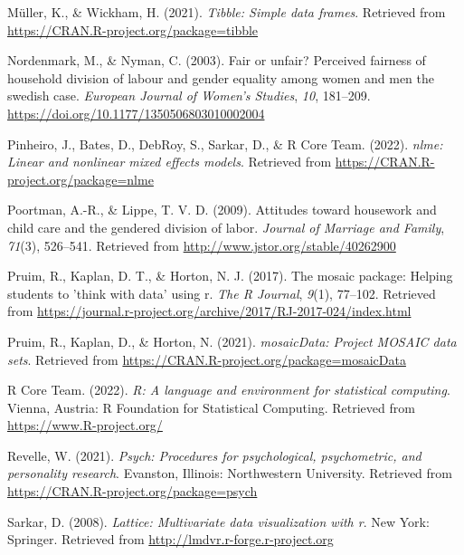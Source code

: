 \documentclass[
  man]{apa6}
\newlength{\cslhangindent}
\newlength{\cslentryspacingunit} %
\newenvironment{CSLReferences}[2] %
 {%
  \setlength{\parindent}{0pt}
  \ifodd #1
  \let\oldpar\par
  \def\par{\hangindent=\cslhangindent\oldpar}
  \fi
  \setlength{\parskip}{#2\cslentryspacingunit}
 }%
 {}
\begin{document}
\begin{CSLReferences}{1}{0}
\leavevmode{}%
Müller, K., \& Wickham, H. (2021). \emph{Tibble: Simple data frames}. Retrieved from \url{https://CRAN.R-project.org/package=tibble}

\leavevmode{}%
Nordenmark, M., \& Nyman, C. (2003). Fair or unfair? Perceived fairness of household division of labour and gender equality among women and men the swedish case. \emph{European Journal of Women's Studies}, \emph{10}, 181--209. \url{https://doi.org/10.1177/1350506803010002004}

\leavevmode{}%
Pinheiro, J., Bates, D., DebRoy, S., Sarkar, D., \& R Core Team. (2022). \emph{{nlme}: Linear and nonlinear mixed effects models}. Retrieved from \url{https://CRAN.R-project.org/package=nlme}

\leavevmode{}%
Poortman, A.-R., \& Lippe, T. V. D. (2009). Attitudes toward housework and child care and the gendered division of labor. \emph{Journal of Marriage and Family}, \emph{71}(3), 526--541. Retrieved from \url{http://www.jstor.org/stable/40262900}

\leavevmode{}%
Pruim, R., Kaplan, D. T., \& Horton, N. J. (2017). The mosaic package: Helping students to 'think with data' using r. \emph{The R Journal}, \emph{9}(1), 77--102. Retrieved from \url{https://journal.r-project.org/archive/2017/RJ-2017-024/index.html}

\leavevmode{}%
Pruim, R., Kaplan, D., \& Horton, N. (2021). \emph{mosaicData: Project MOSAIC data sets}. Retrieved from \url{https://CRAN.R-project.org/package=mosaicData}

\leavevmode{}%
R Core Team. (2022). \emph{R: A language and environment for statistical computing}. Vienna, Austria: R Foundation for Statistical Computing. Retrieved from \url{https://www.R-project.org/}

\leavevmode{}%
Revelle, W. (2021). \emph{Psych: Procedures for psychological, psychometric, and personality research}. Evanston, Illinois: Northwestern University. Retrieved from \url{https://CRAN.R-project.org/package=psych}

\leavevmode{}%
Sarkar, D. (2008). \emph{Lattice: Multivariate data visualization with r}. New York: Springer. Retrieved from \url{http://lmdvr.r-forge.r-project.org}


\end{CSLReferences}
\end{document}
